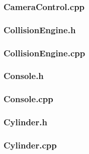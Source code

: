 \documentclass{article}
\begin{document}
\subsubsection{CameraControl.cpp}
	
					
\subsubsection{CollisionEngine.h}
	
					
\subsubsection{CollisionEngine.cpp}
	
					
\subsubsection{Console.h}
	
					
\subsubsection{Console.cpp}
	
					
\subsubsection{Cylinder.h}
	
					
\subsubsection{Cylinder.cpp}
	
					
\end{document}
